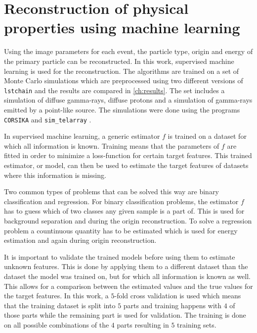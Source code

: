 \chapter{Reconstruction of physical properties using machine learning}
\label{ch:ml}
Using the image parameters for each event, the particle type, origin and energy of the primary particle can be reconstructed.
In this work, supervised machine learning is used for the reconstruction.
The algorithms are trained on a set of Monte Carlo simulations which are preprocessed using two different versions of \texttt{lstchain} 
and the results are compared in \autoref{ch:results}.
The set includes a simulation of diffuse gamma-rays, diffuse protons and a simulation of gamma-rays emitted by a point-like source.
The simulations were done using the programs \texttt{CORSIKA} and \texttt{sim\_telarray} \cite{simulations}.

In supervised machine learning, a generic estimator $f$ is trained on a dataset for which all information is known.
Training means that the parameters of $f$ are fitted in order to minimize a loss-function for certain target features.
This trained estimator, or model, can then be used to estimate the target features of datasets where this information is missing.

Two common types of problems that can be solved this way are binary classification and regression. 
For binary classification problems, the estimator $f$ has to guess which of two classes any given sample is a part of. 
This is used for background separation and during the origin reconstruction.
To solve a regression problem a countinuous quantity has to be estimated which is used for energy estimation and again during origin reconstruction.

It is important to validate the trained models before using them to estimate unknown features.
This is done by applying them to a different dataset than the dataset the model was trained on, but for which all information is known as well.
This allows for a comparison between the estimated values and the true values for the target features.
In this work, a $\num{5}$-fold cross validation is used which means that the training dataset is split into $\num{5}$ parts and training happens 
with $\num{4}$ of those parts while the remaining part is used for validation. 
The training is done on all possible combinations of the $\num{4}$ parts resulting in $\num{5}$ training sets.


